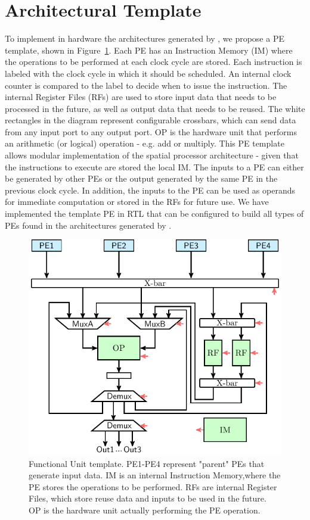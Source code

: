 \vspace{-2mm}
\section{Architectural Template}
\label{sec:arch_template}
To implement in hardware the architectures generated by \frameworkname, we propose a PE template, shown in Figure~\ref{fig:FU_templ}. Each PE has an Instruction Memory (IM) where the operations to be performed at each clock cycle are stored. Each instruction is labeled with the clock cycle in which it should be scheduled. An internal clock counter is compared to the label to decide when to issue the instruction. The internal Register Files (RFs) are used to store input data that needs to be processed in the future, as well as output data that needs to be reused. The white rectangles in the diagram represent configurable crossbars, which can send data from any input port to any output port. OP is the hardware unit that performs an arithmetic (or logical) operation - e.g. add or multiply.
This PE template allows modular implementation of the spatial processor architecture - given that the instructions to execute are stored the local IM. The inputs to a PE can either be generated by other PEs or the output generated by the same PE in the previous clock cycle. In addition, the inputs to the PE can be used as operands for immediate computation or stored in the RFs for future use. We have implemented the template PE in RTL that can be configured to build all types of PEs found in the architectures generated by \frameworkname.

\begin{figure}[tb]
\centering
\includegraphics[width=.5\columnwidth]{images/functional_unit.pdf}
    \caption{\small Functional Unit template. PE1-PE4 represent "parent" PEs that generate input data. IM is an internal Instruction Memory,where the PE stores the operations to be performed. RFs are internal Register Files, which store reuse data and inputs to be used in the future. OP is the hardware unit actually performing the PE operation.}
\label{fig:FU_templ}
\squeezeup
\squeezeup
\end{figure}
